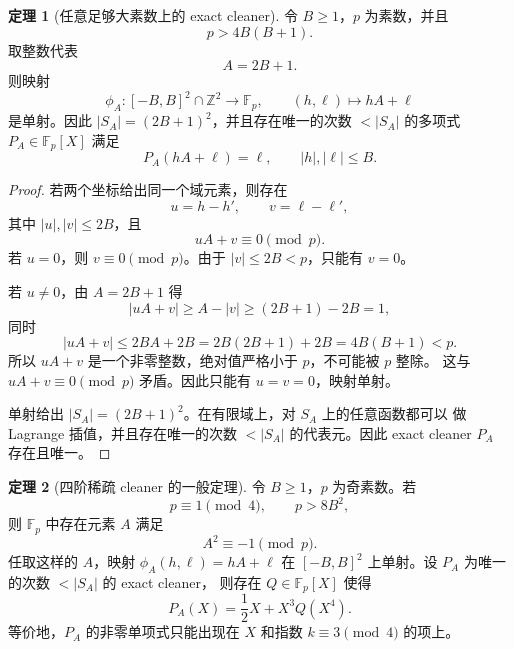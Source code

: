 \documentclass[11pt,a4paper]{ctexart}
\newcommand{\Fp}{\mathbb{F}_p}
\newcommand{\ZZ}{\mathbb{Z}}
\theoremstyle{definition}
\newtheorem{theorem}{定理}
\begin{document}
\begin{theorem}[任意足够大素数上的 exact cleaner]
\label{thm:generic-prime-cleaner}
令 $B\ge1$，$p$ 为素数，并且
\[
  p>4B(B+1).
\]
取整数代表
\[
  A=2B+1.
\]
则映射
\[
  \phi_A:[-B,B]^2\cap\ZZ^2\longrightarrow \Fp,\qquad
  (h,\ell)\longmapsto hA+\ell
\]
是单射。因此 $|S_A|=(2B+1)^2$，并且存在唯一的次数
$<|S_A|$ 的多项式 $P_A\in\Fp[X]$ 满足
\[
  P_A(hA+\ell)=\ell,\qquad |h|,|\ell|\le B.
\]
\end{theorem}

\begin{proof}
若两个坐标给出同一个域元素，则存在
\[
  u=h-h',\qquad v=\ell-\ell',
\]
其中 $|u|,|v|\le2B$，且
\[
  uA+v\equiv0\pmod p.
\]
若 $u=0$，则 $v\equiv0\pmod p$。由于 $|v|\le2B<p$，只能有 $v=0$。

若 $u\ne0$，由 $A=2B+1$ 得
\[
  |uA+v|\ge A-|v|\ge (2B+1)-2B=1,
\]
同时
\[
  |uA+v|\le 2BA+2B=2B(2B+1)+2B=4B(B+1)<p.
\]
所以 $uA+v$ 是一个非零整数，绝对值严格小于 $p$，不可能被 $p$ 整除。
这与 $uA+v\equiv0\pmod p$ 矛盾。因此只能有 $u=v=0$，映射单射。

单射给出 $|S_A|=(2B+1)^2$。在有限域上，对 $S_A$ 上的任意函数都可以
做 Lagrange 插值，并且存在唯一的次数 $<|S_A|$ 的代表元。因此 exact
cleaner $P_A$ 存在且唯一。
\end{proof}

\begin{theorem}[四阶稀疏 cleaner 的一般定理]
\label{thm:order-four-general}
令 $B\ge1$，$p$ 为奇素数。若
\[
  p\equiv1\pmod4,\qquad p>8B^2,
\]
则 $\Fp$ 中存在元素 $A$ 满足
\[
  A^2\equiv-1\pmod p.
\]
任取这样的 $A$，映射 $\phi_A(h,\ell)=hA+\ell$ 在
$[-B,B]^2$ 上单射。设 $P_A$ 为唯一的次数 $<|S_A|$ 的 exact cleaner，
则存在 $Q\in\Fp[X]$ 使得
\[
  \boxed{P_A(X)=\frac12X+X^3Q(X^4).}
\]
等价地，$P_A$ 的非零单项式只能出现在 $X$ 和指数
$k\equiv3\pmod4$ 的项上。
\end{theorem}
\end{document}
